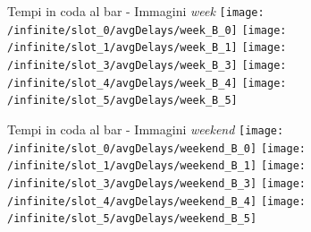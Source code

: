 \documentclass[xcolor=table]{beamer}
\begin{document}
\begin{frame}{Tempi in coda al bar - Immagini \textit{week}}\justifying
\centering
\texttt{[image: /infinite/slot\_0/avgDelays/week\_B\_0]}
\texttt{[image: /infinite/slot\_1/avgDelays/week\_B\_1]}
\texttt{[image: /infinite/slot\_3/avgDelays/week\_B\_3]}
\texttt{[image: /infinite/slot\_4/avgDelays/week\_B\_4]}
\texttt{[image: /infinite/slot\_5/avgDelays/week\_B\_5]}
\end{frame}
\begin{frame}{Tempi in coda al bar - Immagini \textit{weekend}}\justifying
\centering
\texttt{[image: /infinite/slot\_0/avgDelays/weekend\_B\_0]}
\texttt{[image: /infinite/slot\_1/avgDelays/weekend\_B\_1]}
\texttt{[image: /infinite/slot\_3/avgDelays/weekend\_B\_3]}
\texttt{[image: /infinite/slot\_4/avgDelays/weekend\_B\_4]}
\texttt{[image: /infinite/slot\_5/avgDelays/weekend\_B\_5]}
\end{frame}
\end{document}
